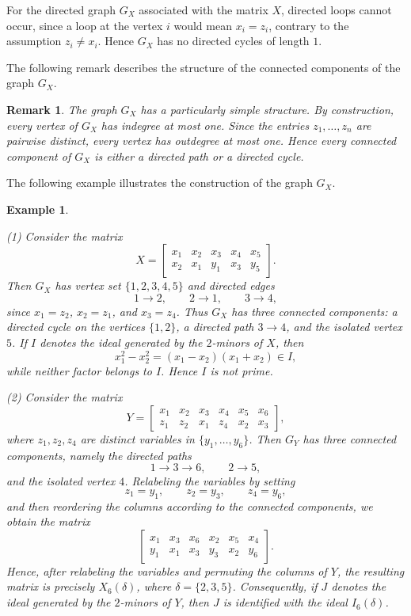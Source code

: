 \documentclass[12pt]{amsart}
\let\to=\rightarrow
\newtheorem{Remark}[Theorem]{Remark}
\newtheorem{Example}[Theorem]{Example}
\begin{document}
For the directed graph $G_X$ associated with the matrix $X$, directed loops cannot occur, since a loop at the vertex $i$ would mean $x_i=z_i$, contrary to the assumption $z_i\neq x_i$. Hence $G_X$ has no directed cycles of length $1$.

The following remark describes the structure of the connected components of the graph $G_X$.

\begin{Remark}\label{rem:def}
{\em The graph $G_X$ has a particularly simple structure. By construction, every
vertex of $G_X$ has indegree at most one. Since the entries
$z_1,\ldots,z_n$ are pairwise distinct, every vertex has outdegree at most
one. Hence every connected component of $G_X$ is either a directed path or
a directed cycle.}
\end{Remark}

The following example illustrates the construction of the graph $G_X$.

\begin{Example}\label{example}
{\em 
(1)
Consider the matrix
\[
X=
\begin{bmatrix}
x_1 & x_2 & x_3 & x_4 & x_5\\
x_2 & x_1 & y_1 & x_3 & y_5
\end{bmatrix}.
\]
Then $G_X$ has vertex set $\{1,2,3,4,5\}$ and directed edges
\[
1\to2,\qquad
2\to1,\qquad
3\to4,
\]
since $x_1=z_2$, $x_2=z_1$, and $x_3=z_4$. Thus $G_X$ has three connected
components: a directed cycle on the vertices $\{1,2\}$, a directed path $3\to4$, and the isolated vertex $5$.  If $I$ denotes the ideal generated by the $2$-minors of $X$, then
\[
x_1^2-x_2^2=(x_1-x_2)(x_1+x_2)\in I,
\]
while neither factor belongs to $I$. Hence $I$ is not prime. 

(2) Consider the matrix
\[
Y=
\begin{bmatrix}
x_1 & x_2 & x_3 & x_4 & x_5 & x_6\\
z_1 & z_2 & x_1 & z_4 & x_2 & x_3
\end{bmatrix},
\]
where $z_1,z_2,z_4$ are distinct variables in
$\{y_1,\ldots,y_6\}$. Then $G_Y$ has three connected components,
namely the directed paths
\[
1\to3\to6,\qquad
2\to5,
\]
and the isolated vertex $4$. Relabeling the variables by setting
\[
z_1=y_1,\qquad
z_2=y_3,\qquad
z_4=y_6,
\]
and then reordering the columns according to the connected components,
we obtain the matrix
\[
\begin{bmatrix}
x_1 & x_3 & x_6 & x_2 & x_5 & x_4\\
y_1 & x_1 & x_3 & y_3 & x_2 & y_6
\end{bmatrix}.
\]
Hence, after relabeling the variables and permuting the columns of $Y$,
the resulting matrix is precisely $X_6(\delta)$, where
$\delta=\{2,3,5\}$. Consequently, if $J$ denotes the ideal generated by
the $2$-minors of $Y$, then $J$ is identified with the ideal
$I_6(\delta)$.
}
\end{Example}
\end{document}
